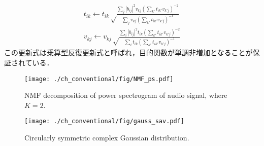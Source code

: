 \begin{align}
    t_{ik} \leftarrow t_{ik} \sqrt \frac{ \sum_j |b_{ij}|^2 v_{kj} \left( \sum_{k'} t_{ik'} v_{k'j} \right)^{-2} }{ \sum_j v_{kj} \left( \sum_{k'} t_{ik'} v_{k'j} \right)^{-1} } \label{eq:MUT} \\
    v_{kj} \leftarrow v_{kj} \sqrt \frac{ \sum_i |b_{ij}|^2 t_{ik} \left( \sum_{k'} t_{ik'} v_{k'j} \right)^{-2} }{ \sum_i t_{ik} \left( \sum_{k'} t_{ik'} v_{k'j} \right)^{-1} } \label{eq:MUV}
\end{align}
この更新式は乗算型反復更新式と呼ばれ，目的関数が単調非増加\textcolor{black}{となる}ことが保証されている．

\begin{figure}[!t]
\centering
\texttt{[image: ./ch\_conventional/fig/NMF\_ps.pdf]}
\caption{NMF decomposition of power spectrogram of audio signal, where $K=2$.}
\label{fig:nmf_ps}
\end{figure}

\begin{figure}[!b]
\centering
\texttt{[image: ./ch\_conventional/fig/gauss\_sav.pdf]}
\caption{Circularly symmetric complex Gaussian distribution.}
\label{fig:gauss}
\end{figure}


